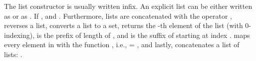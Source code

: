 \begin{isabellebody}
\begin{isamarkuptext}
The list constructor \isa{{\isacharhash}{\kern0pt}} is usually written infix. An explicit list can be either
written as  or as . If 
,  and . Furthermore, lists are concatenated
with the operator \isa{{\isacharat}{\kern0pt}},  reverses a list,  converts a list to a set,  returns the 
-th element of the list  (with 0-indexing),  is the prefix of length  
of , and  is the suffix of  starting at index .
 maps every element in  with the function , i.e., 
 = \mbox{}, and lastly,  concatenates a list of 
lists: .


\end{isamarkuptext}
\end{isabellebody}
